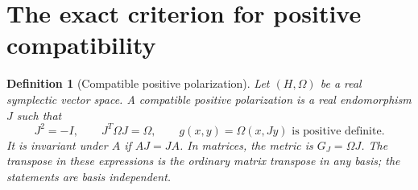\documentclass[11pt,a4paper]{article}
\newtheorem{definition}{Definition}[section]
\theoremstyle{remark}\newtheorem{remark}[definition]{Remark}
\begin{document}
\section{The exact criterion for positive compatibility}

\begin{definition}[Compatible positive polarization]\label{def:polarization}
Let $(H,\Omega)$ be a real symplectic vector space. A compatible positive polarization is a real endomorphism $J$ such that
\[
J^2=-I,\qquad J^T\Omega J=\Omega,\qquad
g(x,y)=\Omega(x,Jy)\text{ is positive definite}.
\]
It is invariant under $A$ if $AJ=JA$. In matrices, the metric is $G_J=\Omega J$. The transpose in these expressions is the ordinary matrix transpose in any basis; the statements are basis independent.
\end{definition}
\end{document}
